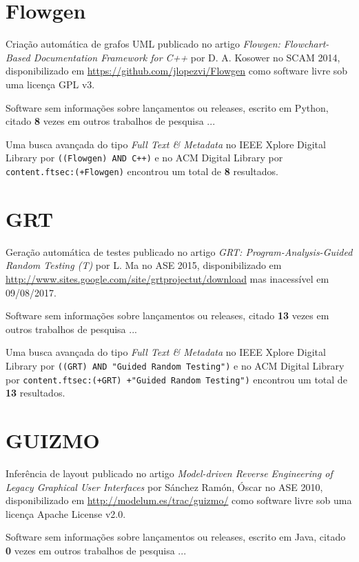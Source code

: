 \section{Flowgen}

Criação automática de grafos UML
publicado no artigo {\it Flowgen: Flowchart-Based Documentation Framework for C++}
por D. A. Kosower
no SCAM 2014,
disponibilizado em \url{https://github.com/jlopezvi/Flowgen}
como software livre
sob uma licença GPL v3.

Software sem informações sobre lançamentos ou releases,
escrito em Python,
citado {\bf 8} vezes em outros trabalhos de pesquisa ...

Uma busca avançada do tipo {\it Full Text \& Metadata} no IEEE Xplore Digital Library por
\texttt{((Flowgen) AND C++)}
e no ACM Digital Library por
\texttt{content.ftsec:(+Flowgen)}
encontrou um total de
{\bf 8}
resultados.

\section{GRT}

Geração automática de testes
publicado no artigo {\it GRT: Program-Analysis-Guided Random Testing (T)}
por L. Ma
no ASE 2015,
disponibilizado em \url{http://www.sites.google.com/site/grtprojectut/download}
mas inacessível em 09/08/2017.

Software sem informações sobre lançamentos ou releases,
citado {\bf 13} vezes em outros trabalhos de pesquisa ...

Uma busca avançada do tipo {\it Full Text \& Metadata} no IEEE Xplore Digital Library por
\texttt{((GRT) AND "Guided Random Testing")}
e no ACM Digital Library por
\texttt{content.ftsec:(+GRT) +"Guided Random Testing")}
encontrou um total de
{\bf 13}
resultados.

\section{GUIZMO}

Inferência de layout
publicado no artigo {\it Model-driven Reverse Engineering of Legacy Graphical User Interfaces}
por S\'{a}nchez Ram\'{o}n, \'{O}scar
no ASE 2010,
disponibilizado em \url{http://modelum.es/trac/guizmo/}
como software livre
sob uma licença Apache License v2.0.

Software sem informações sobre lançamentos ou releases,
escrito em Java,
citado {\bf 0} vezes em outros trabalhos de pesquisa ...

